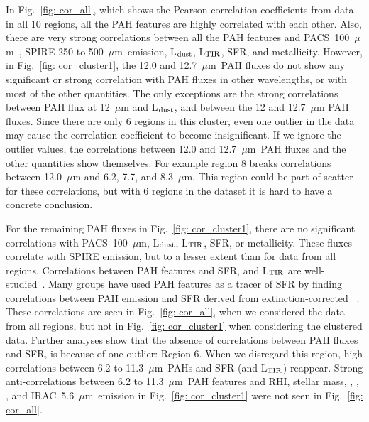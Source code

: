         In Fig.~\ref{fig: cor_all}, which shows the Pearson correlation coefficients from data in all 10 regions, all the PAH features are highly correlated with each other. 
        Also, there are very strong correlations between all the PAH features and PACS~100~$\mu$m~, SPIRE 250 to 500~$\mu$m~emission, L$_{\rm dust}$, L$_{\rm TIR}$, SFR, and metallicity.
        However, in Fig.~\ref{fig: cor_cluster1}, the 12.0 and 12.7~$\mu$m~PAH fluxes do not show any significant or strong correlation with PAH fluxes in other wavelengths, or with most of the other quantities.
        The only exceptions are the strong correlations between PAH flux at 12~$\mu$m and L$_{\rm dust}$, and between the 12 and 12.7~$\mu$m PAH fluxes.
        Since there are only 6 regions in this cluster, even one outlier in the data may cause the correlation coefficient to become insignificant.
        If we ignore the outlier values, the correlations between 12.0 and 12.7~$\mu$m~PAH fluxes and the other quantities show themselves. 
        For example region 8 breaks correlations between 12.0~$\mu$m and 6.2, 7.7, and 8.3~$\mu$m.
        This region could be part of scatter for these correlations, but with 6 regions in the dataset it is hard to have a concrete conclusion.
        
        For the remaining PAH fluxes in Fig.~\ref{fig: cor_cluster1}, there are no significant correlations with PACS~100~$\mu$m, L$_{\rm dust}$, L$_{\rm TIR}$, SFR, or metallicity.
        These fluxes correlate with SPIRE emission, but to a lesser extent than for data from all regions.
        Correlations between PAH features and SFR, and L$_{\rm TIR}$ are well-studied~\citep[e.g.][]{Tielens08,Peeters04}. 
        Many groups have used PAH features as a tracer of SFR by finding correlations between 
        PAH emission and SFR derived from extinction-corrected \halpha~\citep[e.g.][]{Shipley16,Khramtsova13,Calzetti07}.
        These correlations are seen in Fig.~\ref{fig: cor_all}, when we considered the data from all regions, but not in Fig.~\ref{fig: cor_cluster1} when considering the clustered data.
        Further analyses show that the absence of correlations between PAH fluxes and SFR, is because of one outlier: Region 6. 
        When we disregard this region, high correlations between 6.2 to 11.3~$\mu$m~PAHs and SFR (and L$_{\rm TIR}$) reappear.
        Strong anti-correlations between 6.2 to 11.3~$\mu$m~PAH features and RHI, stellar mass, \halpha, \sii, \oiii, and IRAC~5.6~$\mu$m~emission in Fig.~\ref{fig: cor_cluster1} were not seen in Fig.~\ref{fig: cor_all}.
     
